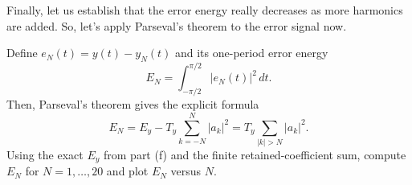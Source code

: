 \documentclass{ee102_pset}
\begin{document}
\problempart[10 points] Finally, let us establish that the error energy really decreases as more harmonics are added. So, let's apply Parseval's theorem to the error signal now.

Define $e_N(t)=y(t)-y_N(t)$ and its
one-period error energy
\[
E_N=\int_{-\pi/2}^{\pi/2}|e_N(t)|^2\,dt.
\]
Then, Parseval's theorem gives the explicit formula
\[
E_N=E_y-T_y\sum_{k=-N}^{N}|a_k|^2
=T_y\sum_{|k|>N}|a_k|^2.
\]
Using the exact $E_y$ from part (f) and the finite retained-coefficient
sum, compute $E_N$ for $N=1,\ldots,20$ and plot $E_N$ versus $N$.
\end{document}
